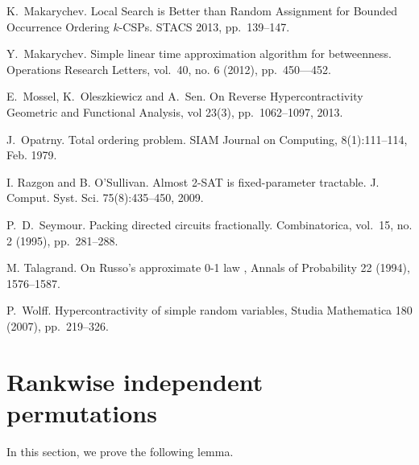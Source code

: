 \documentclass[11pt]{article}
\begin{document}
\begin{thebibliography}{WW}
 K.~Makarychev. Local Search is Better than Random Assignment for Bounded Occurrence Ordering $k$-CSPs. STACS 2013, pp.~139--147.

 Y.~Makarychev. Simple linear time approximation algorithm for betweenness. Operations Research Letters, vol.~40, no. 6 (2012), pp.~450---452.

E.~Mossel, K.~Oleszkiewicz and A.~Sen.
On Reverse Hypercontractivity
Geometric and Functional Analysis, vol 23(3), pp.~1062--1097, 2013.

J.~Opatrny. Total ordering problem. SIAM Journal on Computing, 8(1):111--114, Feb. 1979.

 I. Razgon and B. O'Sullivan. Almost 2-SAT is fixed-parameter tractable. J. Comput. Syst.
Sci. 75(8):435--450, 2009.

 P.~D.~Seymour. Packing directed circuits fractionally. Combinatorica, vol.~15, no. 2 (1995), pp.~281--288.

M. Talagrand. On Russo’s approximate 0-1 law , Annals of Probability 22 (1994), 1576--1587.

P.~Wolff. Hypercontractivity of simple random variables, Studia Mathematica
180 (2007), pp.~219--326.
\end{thebibliography}
\appendix




\section{Rankwise independent permutations}\label{sec:rankwise}
In this section, we prove the following lemma.
\end{document}
